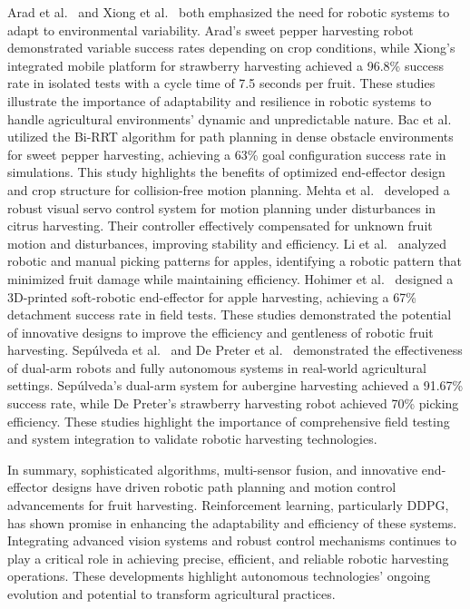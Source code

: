 \documentclass[a4paper,fleqn]{cas-dc}
\begin{document}
Arad et al.~\cite{arad2020development} and Xiong et al.~\cite{xiong2019development} both emphasized the need for robotic systems to adapt to environmental variability. Arad's sweet pepper harvesting robot demonstrated variable success rates depending on crop conditions, while Xiong's integrated mobile platform for strawberry harvesting achieved a 96.8\% success rate in isolated tests with a cycle time of 7.5 seconds per fruit. These studies illustrate the importance of adaptability and resilience in robotic systems to handle agricultural environments' dynamic and unpredictable nature.
Bac et al.~\cite{bac2016analysis} utilized the Bi-RRT algorithm for path planning in dense obstacle environments for sweet pepper harvesting, achieving a 63\% goal configuration success rate in simulations. This study highlights the benefits of optimized end-effector design and crop structure for collision-free motion planning.
Mehta et al.~\cite{mehta2016robust} developed a robust visual servo control system for motion planning under disturbances in citrus harvesting. Their controller effectively compensated for unknown fruit motion and disturbances, improving stability and efficiency.
Li et al.~\cite{li2016characterizing} analyzed robotic and manual picking patterns for apples, identifying a robotic pattern that minimized fruit damage while maintaining efficiency. Hohimer et al.~\cite{hohimer2019design} designed a 3D-printed soft-robotic end-effector for apple harvesting, achieving a 67\% detachment success rate in field tests. These studies demonstrated the potential of innovative designs to improve the efficiency and gentleness of robotic fruit harvesting.
Sepúlveda et al.~\cite{sepulveda2020robotic} and De Preter et al.~\cite{de2018development} demonstrated the effectiveness of dual-arm robots and fully autonomous systems in real-world agricultural settings. Sepúlveda's dual-arm system for aubergine harvesting achieved a 91.67\% success rate, while De Preter's strawberry harvesting robot achieved 70\% picking efficiency. These studies highlight the importance of comprehensive field testing and system integration to validate robotic harvesting technologies.

In summary, sophisticated algorithms, multi-sensor fusion, and innovative end-effector designs have driven robotic path planning and motion control advancements for fruit harvesting. Reinforcement learning, particularly DDPG, has shown promise in enhancing the adaptability and efficiency of these systems. Integrating advanced vision systems and robust control mechanisms continues to play a critical role in achieving precise, efficient, and reliable robotic harvesting operations. These developments highlight autonomous technologies' ongoing evolution and potential to transform agricultural practices.
\iffalse
\end{document}
